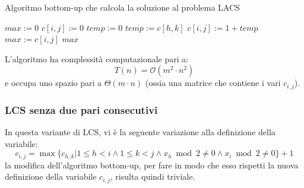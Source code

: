 \documentclass[12pt]{article}
\begin{document}
\begin{algorithm}[H]
    \caption{Algoritmo bottom-up che calcola la soluzione al problema LACS}
    \DontPrintSemicolon
     {
        $max := 0$ \;
         {
             {
                 {
                    $c[i,j] := 0$
                } {
                    $temp := 0$ \;
                     {
                         {
                             {
                                $temp := c[h,k]$
                            }
                        }
                    }
                    $c[i,j] := 1 + temp$ \;
                }
                 {
                        $max := c[i,j]$
                    }
            }
        }
        \Return $max$
    }
\end{algorithm} \noindent
L'algoritmo ha complessità computazionale pari a:
$$T(n) = \mathcal{O}(m^2 \cdot n^2)$$
e occupa uno spazio pari a $\Theta(m \cdot n)$ (ossia una matrice che contiene i vari $c_{i,j}$).
\subsubsection{LCS senza due pari consecutivi}
In questa variante di LCS, vi è la seguente variazione alla definizione della variabile:
$$c_{i,j} = \max\{c_{h,k}|1 \leq h < i \land 1 \leq k < j \land x_h \bmod 2 \neq 0 \land x_i \bmod 2 \neq 0\} + 1$$
la modifica dell'algoritmo bottom-up, per fare in modo che esso rispetti la nuova definizione della variabile $c_{i,j}$, risulta quindi triviale.
\end{document}
